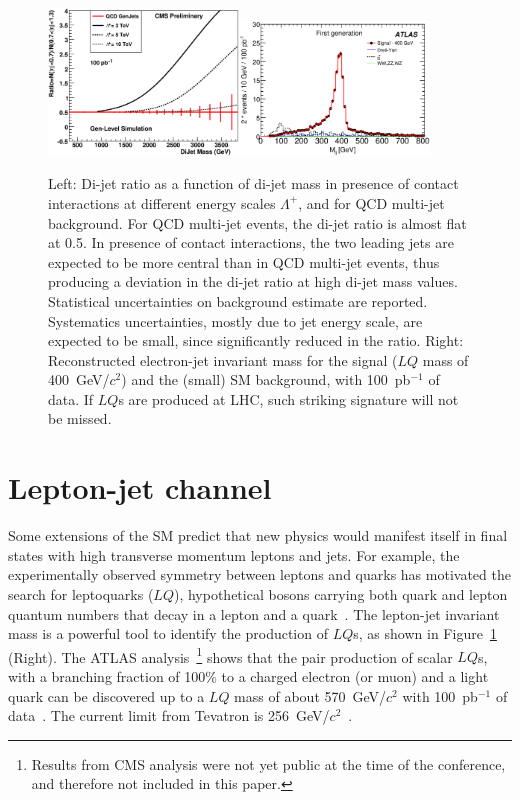 \documentclass{cmspaper}
\begin{document}
\begin{figure}[htbp] 
\centering
\includegraphics[width=0.45\textwidth]{DiJetRatio100pbOptFix.eps}\includegraphics[width=0.45\textwidth]{Mejfig5R.eps}  
\caption{Left: Di-jet ratio as a function of di-jet mass in presence of 
contact interactions at different energy scales $\Lambda^{+}$, 
and for QCD multi-jet background. 
For QCD multi-jet events, the di-jet ratio is almost flat at 0.5. 
In presence of contact interactions, the two 
leading jets are expected to be more central than in QCD multi-jet events, 
thus producing a deviation in the di-jet ratio at high di-jet mass values.
Statistical uncertainties on background estimate are reported.  
Systematics uncertainties, mostly due to jet energy scale, are expected to be small, 
since significantly reduced in the ratio.
Right: Reconstructed electron-jet invariant mass for the signal 
($LQ$ mass of 400~GeV/$c^2$) and the (small) SM background, 
with 100~pb$^{-1}$ of data. If $LQ$s are produced at LHC, 
such striking signature will not be missed.}
\label{fig:DiJetRatioAndLQMej}
\end{figure}

\section{Lepton-jet channel} \label{leptonjet}
Some extensions of the SM predict that new physics would manifest itself in 
final states with high transverse momentum leptons and jets.
For example, the experimentally observed symmetry between 
leptons and quarks has motivated the search for leptoquarks ($LQ$), 
hypothetical bosons carrying both quark and lepton quantum numbers 
that decay in a lepton and a quark~\cite{Acosta:1999ws}.
The lepton-jet invariant mass is a powerful tool to identify the production 
of $LQ$s, as shown in Figure~\ref{fig:DiJetRatioAndLQMej} (Right). 
The ATLAS analysis~\footnote{Results from CMS analysis were not yet public at the time 
of the conference, and therefore not included in this paper.} 
shows that the pair production of scalar $LQ$s, with a branching fraction of 100\% 
to a charged electron (or muon) and a light quark can be discovered up to a $LQ$ 
mass of about 570~GeV/$c^2$ with 100~pb$^{-1}$ of data~\cite{LQATLAS}. 
The current limit from Tevatron is 256~GeV/$c^2$~\cite{Abazov:2004mk}.
\end{document}
